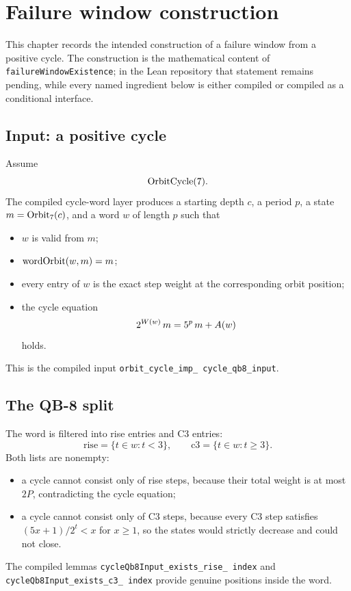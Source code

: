 \section{Failure window construction}

This chapter records the intended construction of a failure window
from a positive cycle.  The construction is the mathematical content
of \texttt{failureWindowExistence}; in the Lean repository that
statement remains pending, while every named ingredient below is
either compiled or compiled as a conditional interface.

\subsection{Input: a positive cycle}

Assume
\begin{equation*}
  \mathrm{OrbitCycle}(7).
\end{equation*}
The compiled cycle-word layer produces a starting depth $c$, a period
$p$, a state $m=\mathrm{Orbit}_7(c)$, and a word $w$ of length $p$ such that
\begin{itemize}[leftmargin=*]
\item $w$ is valid from $m$;
\item $\mathrm{wordOrbit}(w,m)=m$;
\item every entry of $w$ is the exact step weight at the
  corresponding orbit position;
\item the cycle equation
  \begin{equation*}
    2^{W(w)}\,m=5^p\,m+A(w)
  \end{equation*}
  holds.
\end{itemize}
This is the compiled input
\texttt{orbit\_\allowbreak cycle\_\allowbreak imp\_\allowbreak
cycle\_\allowbreak qb8\_\allowbreak input}.

\subsection{The QB-8 split}

The word is filtered into rise entries and C3 entries:
\begin{equation*}
  \mathrm{rise}=\{t\in w:t<3\},
  \qquad
  \mathrm{c3}=\{t\in w:t\ge3\}.
\end{equation*}
Both lists are nonempty:
\begin{itemize}[leftmargin=*]
\item a cycle cannot consist only of rise steps, because their total
  weight is at most $2P$, contradicting the cycle equation;
\item a cycle cannot consist only of C3 steps, because every C3 step
  satisfies $(5x+1)/2^t<x$ for $x\ge1$, so the states would strictly
  decrease and could not close.
\end{itemize}
The compiled lemmas
\texttt{cycleQb8Input\_\allowbreak exists\_\allowbreak rise\_\allowbreak
index} and
\texttt{cycleQb8Input\_\allowbreak exists\_\allowbreak c3\_\allowbreak
index} provide genuine positions inside the word.

